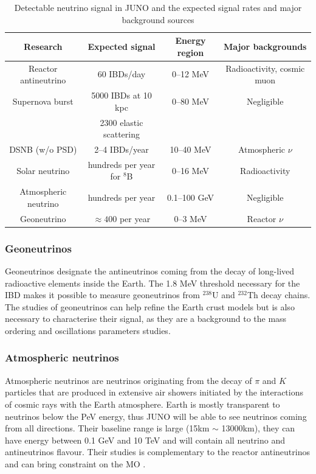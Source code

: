 \begin{table}[ht]
\begin{center}
  \begin{tabular}{|c|c|c|c|}
    \hline Research & Expected signal & Energy region & Major backgrounds \\
    \hline Reactor antineutrino & 60 IBDs/day & 0–12 MeV  & Radioactivity, cosmic muon \\
    Supernova burst & 5000 IBDs at 10 kpc & 0–80 MeV & Negligible \\
                    & 2300 elastic scattering  & &  \\
    DSNB (w/o PSD) & 2–4 IBDs/year & 10–40 MeV & Atmospheric $\nu$ \\
    Solar neutrino & hundreds per year for $^8$B & 0–16 MeV & Radioactivity \\
    Atmospheric neutrino & hundreds per year & 0.1–100 GeV  & Negligible \\
    Geoneutrino &  $\approx 400$ per year & 0–3 MeV & Reactor $\nu$ \\
    \hline
  \end{tabular}
  \caption{Detectable neutrino signal in JUNO and the expected signal rates and major background sources}
  \label{tab:signal}
\end{center}
\end{table}


\subsubsection{Geoneutrinos}

Geoneutrinos designate the antineutrinos coming from the decay of long-lived radioactive elements inside the Earth. The 1.8 MeV threshold necessary for the IBD makes it possible to measure geoneutrinos from $^238$U and $^232$Th decay chains. The studies of geoneutrinos can help refine the Earth crust models but is also necessary to characterise their signal, as they are a background to the mass ordering and oscillations parameters studies.

\subsubsection{Atmospheric neutrinos}

Atmospheric neutrinos are neutrinos originating from the decay of $\pi$ and $K$ particles that are produced in extensive air showers initiated by the interactions of cosmic rays with the Earth atmosphere. Earth is mostly transparent to neutrinos below the PeV energy, thus JUNO will be able to see neutrinos coming from all directions. Their baseline range is large (15km $\sim$ 13000km), they can have energy between 0.1 GeV and 10 TeV and will contain all neutrino and antineutrinos flavour. Their studies is complementary to the reactor antineutrinos and can bring constraint on the MO \cite{an_neutrino_2016}.


